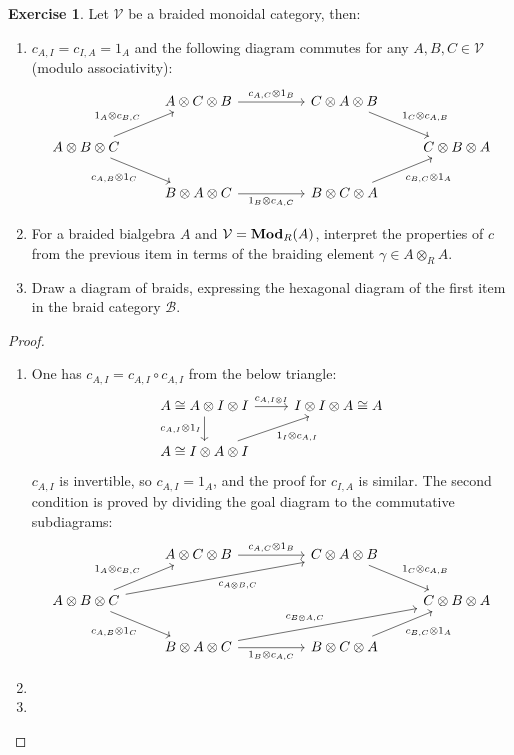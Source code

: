 \documentclass[8pt]{article}
\theoremstyle{definition}
\theoremstyle{definition}
\theoremstyle{definition}
\theoremstyle{definition}
\theoremstyle{definition}
\theoremstyle{definition}
\theoremstyle{definition}
\theoremstyle{definition}
\theoremstyle{definition}
\theoremstyle{definition}
\theoremstyle{definition}
\theoremstyle{definition}
\theoremstyle{definition}
\newtheorem{exercise}{Exercise}[section]
\theoremstyle{definition}
\theoremstyle{question}
\begin{document}
\begin{exercise} Let $\mathcal{V}$ be a braided monoidal category, then:
  \begin{enumerate}
    \item $c_{A,I} = c_{I, A} = 1_A$ and the following diagram commutes for any $A, B, C \in \mathcal{V}$ (modulo associativity):
    \[
    \begin{tikzcd}
      & A \otimes C \otimes B \ar[rr, "c_{A,C} \otimes 1_B"] && C \otimes A \otimes B \ar[dr, "1_C \otimes c_{A,B}"]\\
      A \otimes B \otimes C \ar[dr, "c_{A, B} \otimes 1_C"'] \ar[ur, "1_A \otimes c_{B,C}"] &&&& C \otimes B \otimes A \\
      & B \otimes A \otimes C \ar[rr, "1_B \otimes c_{A,C}"'] && B \otimes C \otimes A \ar[ur, "c_{B, C} \otimes 1_A"']
    \end{tikzcd}
    \]
    \item For a braided bialgebra $A$ and $\mathcal{V} = {\bf Mod}_R(A)$, interpret the properties of $c$ from the previous item in terms of the braiding
    element $\gamma \in A \otimes_R A$.
    \item Draw a diagram of braids, expressing the hexagonal diagram of the first item in the braid category $\mathcal{B}$.
  \end{enumerate}
\end{exercise}

\begin{proof}
  $ $

  \begin{enumerate}
    \item One has $c_{A,I} = c_{A,I} \circ c_{A,I}$ from the below triangle:
    \[
    \begin{tikzcd}
      A \cong A \otimes I \otimes I \ar[r, "c_{A, I \otimes I}"] \ar[d, "c_{A,I} \otimes 1_I"'] & I \otimes I \otimes A \cong A \\
      A \cong I \otimes A \otimes I \ar[ur, "1_I \otimes c_{A,I}"']
    \end{tikzcd}
    \]
    $c_{A,I}$ is invertible, so $c_{A,I} = 1_A$, and the proof for $c_{I,A}$ is similar. The second condition is proved by dividing the goal diagram
    to the commutative subdiagrams:
      \[
    \begin{tikzcd}
      & A \otimes C \otimes B \ar[rr, "c_{A,C} \otimes 1_B"] && C \otimes A \otimes B \ar[dr, "1_C \otimes c_{A,B}"]\\
      A \otimes B \otimes C \ar[dr, "c_{A, B} \otimes 1_C"'] \ar[urrr, "c_{A \otimes B, C}"'] \ar[ur, "1_A \otimes c_{B,C}"] &&&& C \otimes B \otimes A \\
      & B \otimes A \otimes C \ar[rr, "1_B \otimes c_{A,C}"'] \ar[urrr, "c_{B \otimes A, C}"] && B \otimes C \otimes A \ar[ur, "c_{B, C} \otimes 1_A"']
    \end{tikzcd}
    \]
    \item
    \item 
  \end{enumerate}
\end{proof}
\end{document}

